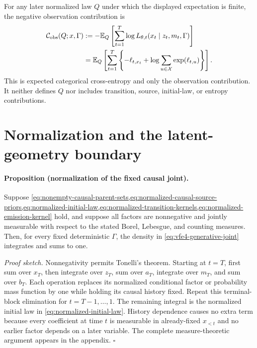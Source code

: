 For any later normalized law $Q$ under which the displayed expectation is finite, the negative observation contribution is
\begin{equation}
\begin{aligned}
\mathcal C_{\mathrm{obs}}(Q;x,\Gamma)
&:=-\mathbb E_Q\left[
\sum_{t=1}^T\log L_{\theta,t}(x_t\mid z_t,m_t,\Gamma)
\right]\\
&=\mathbb E_Q\left[
\sum_{t=1}^T
\left\{-\ell_{t,x_t}+\log\sum_{u\in\mathcal X}\exp(\ell_{t,u})\right\}
\right].
\end{aligned}
\label{eq:expected-categorical-cross-entropy}
\end{equation}
This is expected categorical cross-entropy and only the observation contribution.  It neither defines $Q$ nor includes transition, source, initial-law, or entropy contributions.

\section{Normalization and the latent-geometry boundary}

\paragraph{Proposition (normalization of the fixed causal joint).}
Suppose \cref{eq:nonempty-causal-parent-sets,eq:normalized-causal-source-priors,eq:normalized-initial-law,eq:normalized-transition-kernels,eq:normalized-emission-kernel} hold, and suppose all factors are nonnegative and jointly measurable with respect to the stated Borel, Lebesgue, and counting measures.  Then, for every fixed deterministic $\Gamma$, the density in \cref{eq:vfe4-generative-joint} integrates and sums to one.

\emph{Proof sketch.}
Nonnegativity permits Tonelli's theorem.  Starting at $t=T$, first sum over $x_T$, then integrate over $z_T$, sum over $a_T$, integrate over $m_T$, and sum over $b_T$.  Each operation replaces its normalized conditional factor or probability mass function by one while holding its causal history fixed.  Repeat this terminal-block elimination for $t=T-1,\ldots,1$.  The remaining integral is the normalized initial law in \cref{eq:normalized-initial-law}.  History dependence causes no extra term because every coefficient at time $t$ is measurable in already-fixed $x_{<t}$ and no earlier factor depends on a later variable.  The complete measure-theoretic argument appears in the appendix.  \hfill$\square$

